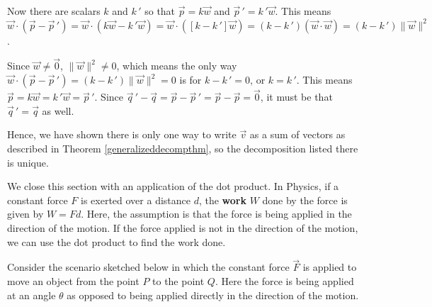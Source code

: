 \documentclass{ximera}
\begin{document}
 

Now there are scalars $k$ and $k \,'$ so that $\overrightarrow{p} = k \overrightarrow{w}$ and $\overrightarrow{p} \,' = k\,'\overrightarrow{w}$.   This means  $\overrightarrow{w} \cdot (\overrightarrow{p} - \overrightarrow{p} \,') = \overrightarrow{w} \cdot ( k \overrightarrow{w} - k \,' \overrightarrow{w}) = \overrightarrow{w} \cdot ([k - k \,'] \overrightarrow{w}) = (k - k \,') (\overrightarrow{w} \cdot \overrightarrow{w}) = (k - k \,') \| \overrightarrow{w} \|^2$.  

 

Since $\overrightarrow{w} \neq \overrightarrow{0}$, $\| \overrightarrow{w} \|^2 \neq 0$, which means the only way $\overrightarrow{w} \cdot (\overrightarrow{p} - \overrightarrow{p} \,') = (k - k \,') \| \overrightarrow{w} \|^2  = 0$ is for $k - k \,' = 0$, or $k = k \,'$.  This means $\overrightarrow{p} = k \overrightarrow{w} = k \,' \overrightarrow{w} = \overrightarrow{p} \,'$.  Since $\overrightarrow{q} \,' - \overrightarrow{q} = \overrightarrow{p} - \overrightarrow{p} \,' = \overrightarrow{p} - \overrightarrow{p} = \overrightarrow{0}$, it must be that $\overrightarrow{q} \,' = \overrightarrow{q}$ as well.  

 

Hence, we have shown there is only one way to write $\overrightarrow{v}$ as a sum of vectors as described in Theorem  \ref{generalizeddecompthm}, so the decomposition listed there is unique.

 


We close this section with an application of the dot product. In Physics, if a constant force $F$ is exerted over a distance $d$, the  \textbf{work} $W$ done by the force is given by $W = Fd$. Here, the assumption is that the force is being applied in the direction of the motion.  If the force applied is not in the direction of the motion, we can use the dot product to find the work done.  

 

Consider the scenario sketched below in which  the constant force $\overrightarrow{F}$ is applied to move an object from the point $P$ to the point $Q$.  Here the force is being applied at an angle $\theta$ as opposed to being applied directly in the direction of the motion.
\end{document}
